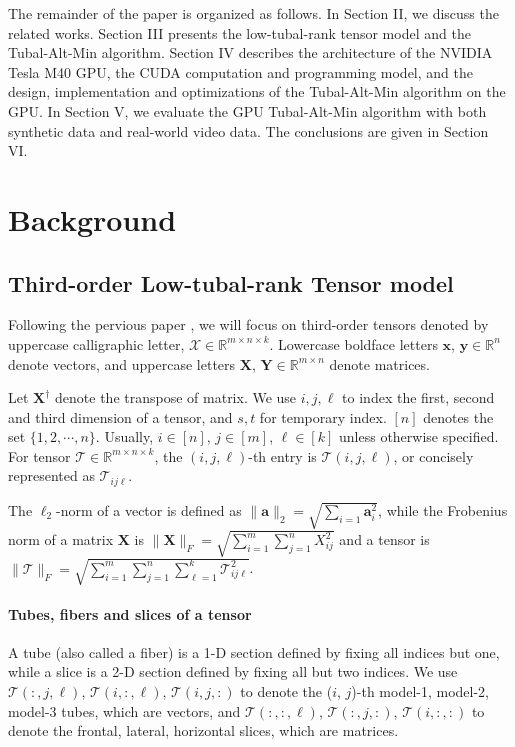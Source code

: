 \documentclass[format=acmsmall, review=false, screen=true]{acmart}
\begin{document}
The remainder of the paper is organized as follows. In Section II, we discuss the related works. Section III presents the low-tubal-rank tensor model and the Tubal-Alt-Min algorithm. Section IV describes the architecture of the NVIDIA Tesla M40 GPU, the CUDA computation and programming model, and the design, implementation and optimizations of the Tubal-Alt-Min algorithm on the GPU. In Section V, we evaluate the GPU Tubal-Alt-Min algorithm with both synthetic data and real-world video data. The conclusions are given in Section VI.



\section{Background}
\subsection{Third-order Low-tubal-rank Tensor model}

Following the pervious paper \cite{XiaoYang2016Low} \cite{liu2017fourth}, we will focus on
third-order tensors denoted by uppercase calligraphic letter,
$\mathcal{X} \in \mathbb{R}^{m \times n \times k}$. Lowercase boldface
letters $\mathbf{x}$, $\mathbf{y} \in \mathbb{R}^n$ denote vectors, and
uppercase letters $\mathbf{X}$, $\mathbf{Y} \in \mathbb{R}^{m \times n}$ denote matrices.

Let $\mathbf{X}^{\dagger}$ denote the transpose of matrix. We use
$i, j, \ell$ to index the first, second and third dimension of a tensor,
and $s, t$ for temporary index.
$[n]$ denotes the set $\{1, 2, \cdots, n\}$. Usually, $i\in [n]$, $j\in [m]$, $\ell\in [k]$ unless otherwise specified.
 For tensor $\mathcal {T} \in \mathbb{R}^{m \times n
\times k}$, the $(i, j, \ell)$-th entry is $\mathcal{T}(i, j, \ell)$, or
concisely represented as $\mathcal{T}_{ij\ell}$.


The $\ell_2$-norm of a vector is defined as $\|\mathbf {a} \|_2 = \sqrt{\sum _{i = 1} \mathbf {a}^2_i}$, while the Frobenius norm of a matrix $\mathbf{X}$ is $\|\mathbf{X}\|_F = \sqrt{\sum ^m_{i = 1} \sum ^n_{j = 1} X^2_{ij} }$ and a tensor is $\|\mathcal{T}\|_F = \sqrt{\sum ^m_{i = 1} \sum ^n_{j = 1} \sum ^k_{\ell = 1} \mathcal{T}^2_{ij\ell}}$.


\paragraph{Tubes, fibers and slices of a tensor} A tube (also called
a fiber) is a 1-D section defined by fixing all indices but one, while
a slice is a 2-D section defined by fixing all but two indices. We use
$\mathcal{T}(:, j, \ell)$, $\mathcal{T}(i, :, \ell)$, $\mathcal{T}(i, j, :)$ to
denote the ($i$, $j$)-th model-1, model-2, model-3 tubes, which are
vectors, and $\mathcal{T}(:, :, \ell)$, $\mathcal{T}(:, j, :)$, $\mathcal{T}(i, :, :)$ to denote the frontal, lateral, horizontal slices, which are matrices. 
\end{document}
